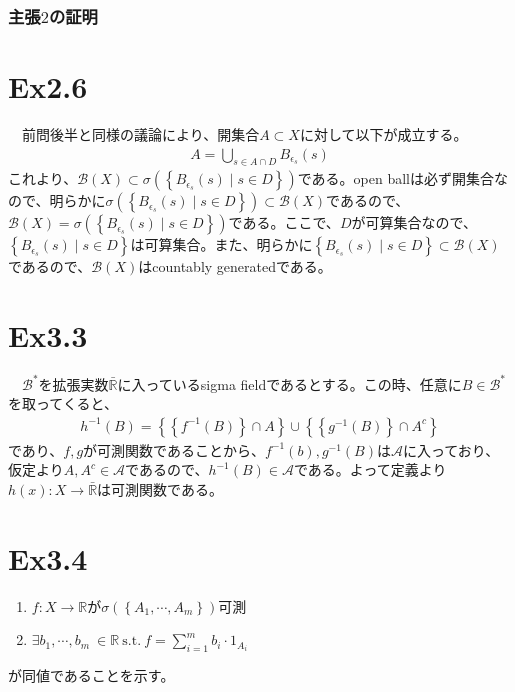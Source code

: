 \documentclass{article}
\begin{document}
\subsubsection{主張$2$の証明}

\section{Ex2.6}
　前問後半と同様の議論により、開集合$A\subset X$に対して以下が成立する。
\begin{align*}
	A = \bigcup_{s\in A\cap D} B_{\epsilon_s}(s)
\end{align*}
これより、$\mathcal{B}(X)\subset \sigma\left( \left\{ B_{\epsilon_s}(s)\mid s\in D \right\} \right)$である。open ballは必ず開集合なので、明らかに$\sigma\left( \left\{ B_{\epsilon_s}(s)\mid s\in D \right\} \right) \subset \mathcal{B}(X)$であるので、$\mathcal{B}(X) = \sigma\left( \left\{ B_{\epsilon_s}(s)\mid s\in D \right\} \right)$である。ここで、$D$が可算集合なので、$\left\{ B_{\epsilon_s}(s)\mid s\in D \right\}$は可算集合。また、明らかに$\left\{ B_{\epsilon_s}(s)\mid s\in D \right\} \subset \mathcal{B}(X)$であるので、$\mathcal{B}(X)$はcountably generatedである。


\section{Ex3.3}
　$\mathcal{B}^{*}$を拡張実数$\bar{\mathbb{R}}$に入っているsigma fieldであるとする。この時、任意に$B \in \mathcal{B}^{*}$を取ってくると、
\begin{align*}
	h^{-1}(B) = \left\{ \left\{ f^{-1}(B) \right\}\cap A \right\} \cup \left\{ \left\{ g^{-1}(B) \right\}\cap A^c \right\}
\end{align*}
であり、$f,g$が可測関数であることから、$f^{-1}(b),g^{-1}(B)$は$\mathcal{A}$に入っており、仮定より$A,A^c\in \mathcal{A}$であるので、$h^{-1}(B)\in \mathcal{A}$である。よって定義より$h(x):X\to\bar{\mathbb{R}}$は可測関数である。


\section{Ex3.4}
\begin{enumerate}
	\item $f:X\to\mathbb{R}$が$\sigma\left( \left\{ A_1, \cdots, A_m\right\} \right)$可測
	\item $\exists b_1,\cdots,b_m\ \in \mathbb{R}\ \text{s.t.}\ f = \sum_{i=1}^{m} b_i \cdot 1_{A_i}$
\end{enumerate}
が同値であることを示す。
\end{document}
